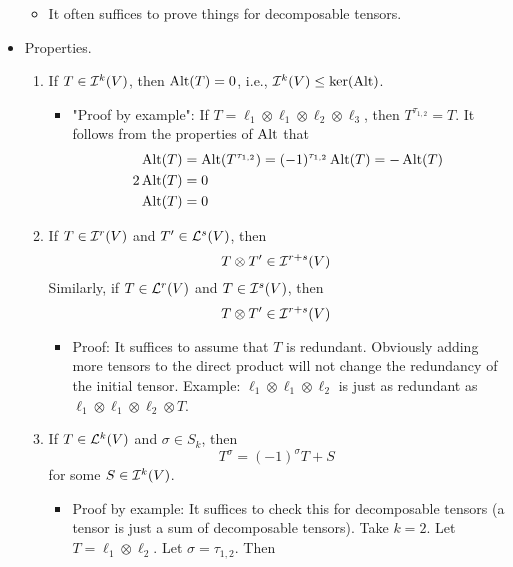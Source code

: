 \documentclass[../notes.tex]{subfiles}
\begin{document}
\begin{itemize}
    \begin{itemize}
        \item It often suffices to prove things for decomposable tensors.
    \end{itemize}
    \item Properties.
    \begin{enumerate}
        \item If $T\in\ide[k]{V}$, then $\Alt(T)=0$, i.e., $\ide[k]{V}\leq\ker(\Alt)$.
        \begin{itemize}
            \item "Proof by example": If $T=\ell_1\otimes\ell_1\otimes\ell_2\otimes\ell_3$, then $T^{\tau_{1,2}}=T$. It follows from the properties of $\Alt$ that
            \begin{align*}
                \Alt(T) &= \Alt(T^{\tau_{1,2}})
                = (-1)^{\tau_{1,2}}\Alt(T)
                = -\Alt(T)\\
                2\Alt(T) &= 0\\
                \Alt(T) &= 0
            \end{align*}
        \end{itemize}
        \item If $T\in\ide[r]{V}$ and $T'\in\lin[s]{V}$, then
        \begin{equation*}
            T\otimes T'\in\ide[r+s]{V}
        \end{equation*}
        Similarly, if $T\in\lin[r]{V}$ and $T\in\ide[s]{V}$, then
        \begin{equation*}
            T\otimes T'\in\ide[r+s]{V}
        \end{equation*}
        \begin{itemize}
            \item Proof: It suffices to assume that $T$ is redundant. Obviously adding more tensors to the direct product will not change the redundancy of the initial tensor. Example: $\ell_1\otimes\ell_1\otimes\ell_2$ is just as redundant as $\ell_1\otimes\ell_1\otimes\ell_2\otimes T$.
        \end{itemize}
        \item If $T\in\lin[k]{V}$ and $\sigma\in S_k$, then
        \begin{equation*}
            T^\sigma = (-1)^\sigma T+S
        \end{equation*}
        for some $S\in\ide[k]{V}$.
        \begin{itemize}
            \item Proof by example: It suffices to check this for decomposable tensors (a tensor is just a sum of decomposable tensors). Take $k=2$. Let $T=\ell_1\otimes\ell_2$. Let $\sigma=\tau_{1,2}$. Then

\end{itemize}
\end{enumerate}
\end{itemize}
\end{document}
